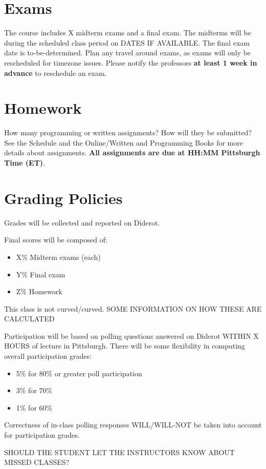 \section{Exams}


The course includes X midterm exams and a final exam.
%
The midterms will be during the scheduled class period on DATES IF AVAILABLE.
%
The final exam date is to-be-determined. 
%
Plan any travel around exams, as exams will only be rescheduled for timezone issues. 
%
Please notify the professors \textbf{at least 1 week in advance} to reschedule an exam.

\section{Homework}

How many programming or written assignments?
%
How will they be submitted?  
%
See the Schedule and the Online/Written and Programming Books for more details about assignments. 
%
\textbf{All assignments are due at HH:MM Pittsburgh Time (ET)}.

\section{Grading Policies}

\begin{gram}
Grades will be collected and reported on Diderot.
%

Final scores will be composed of:
\begin{itemize}
\item X\% Midterm exams (each)
\item Y\% Final exam
\item Z\% Homework
\end{itemize}
\end{gram}          

\begin{gram}
This class is not curved/curved. 
%
SOME INFORMATION ON HOW THESE ARE CALCULATED
\end{gram}


\begin{gram}
Participation will be based on polling questions answered on Diderot WITHIN X HOURS of lecture in Pittsburgh. 
%
There will be some flexibility in computing overall participation grades:
          \begin{itemize}
            \item 5\% for 80\% or greater poll participation
            \item 3\% for 70\%
            \item 1\% for 60\%
            \end{itemize}
%
Correctness of in-class polling responses WILL/WILL-NOT be taken into account for participation grades.

SHOULD THE STUDENT LET THE INSTRUCTORS KNOW ABOUT MISSED CLASSES?
\end{gram}

